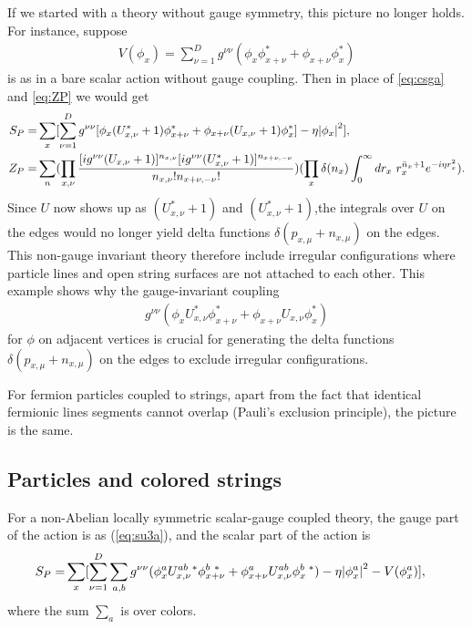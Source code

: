 \documentclass[12pt]{article}
\theoremstyle{definition}
\begin{document}
If we started with a theory without gauge symmetry, this picture no longer holds. For instance, suppose
\begin{align}
V(\phi_x)=\sum_{\nu=1}^D g^{\nu\nu}(\phi_x \phi^*_{x+\nu} + \phi_{x+\nu} \phi^*_{x})
\end{align}
is as in a bare scalar action without gauge coupling. Then in place of \eqref{eq:csga} and \eqref{eq:ZP} we would get
\begin{align}
S_P=& \sum_x [ \sum_{\nu=1}^D g^{\nu\nu}[\phi_x (U_{x,\nu}^*+1) \phi^*_{x+\nu} + \phi_{x+\nu} (U_{x,\nu}+1) \phi^*_{x} ] -\eta \abs{\phi_x}^2],
\\
Z_P=&\sum_{n}(\prod_{x,\nu} \frac{[i g^{\nu\nu}(U_{x,\nu}+1) ]^{n_{x,\nu}} [ig^{\nu\nu}(U_{x,\nu}^*+1)]^{n_{x+\nu,-\nu}}}{n_{x,\nu}! n_{x+\nu,-\nu}!}) (\prod_{x} \delta(n_x) \int_0^\infty dr_x ~ r_x^{\bar{n}_x+1} e^{-i\eta r_x^2}).
\end{align}
Since $U$ now shows up as $(U_{x,\nu}^*+1)$ and $(U_{x,\nu}^*+1)$,the integrals over $U$ on the edges would no longer yield delta functions $\delta(p_{x,\mu}+n_{x,\mu})$ on the edges. This non-gauge invariant theory therefore include irregular configurations where particle lines and open string surfaces are not attached to each other. This example shows why the gauge-invariant coupling
\begin{align}
    g^{\nu\nu}(\phi_x U_{x,\nu}^* \phi^*_{x+\nu} + \phi_{x+\nu} U_{x,\nu} \phi^*_{x} )
\end{align}
for $\phi$ on adjacent vertices is crucial for generating the delta functions $\delta(p_{x,\mu}+n_{x,\mu})$ on the edges to exclude irregular configurations.

For fermion particles coupled to strings, apart from the fact that identical fermionic lines segments cannot overlap (Pauli's exclusion principle), the picture is the same.

\subsection{Particles and colored strings}

For a non-Abelian locally symmetric scalar-gauge coupled theory, the gauge part of the action is as (\ref{eq:su3a}), and the scalar part of the action is
\begin{align}
S_P=& \sum_x [ \sum_{\nu=1}^D \sum_{a,b} g^{\nu\nu}(\phi_{x}^a U_{x,\nu}^{ab~*} \phi^{b~*}_{x+\nu} + \phi_{x+\nu}^a U_{x,\nu}^{ab} \phi^{b~*}_{x} ) -\eta \abs{\phi_x^a}^2  - V(\phi_x^a)],\label{eq:csnaga}
\end{align}
where the sum $\sum_a$ is over colors. 
\end{document}
